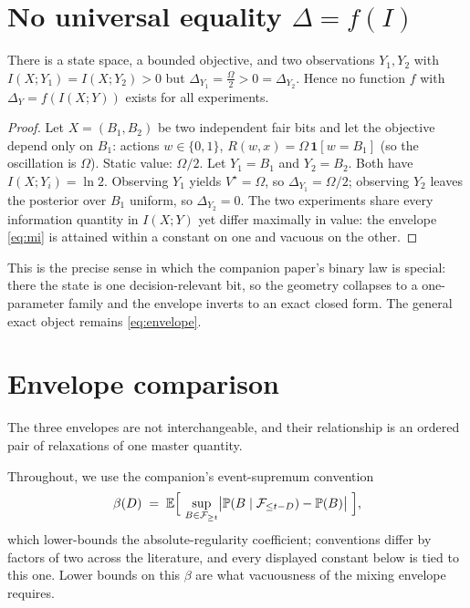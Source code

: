 \documentclass[acmsmall,screen,review,anonymous]{acmart}
\newcommand{\E}{\mathbb{E}}
\begin{document}
\section{No universal equality \texorpdfstring{$\Delta=f(I)$}{Delta=f(I)}}
\label{sec:noequality}

\begin{proposition}
\label{prop:noneq}
There is a state space, a bounded objective, and two observations
$Y_1, Y_2$ with $I(X;Y_1)=I(X;Y_2)>0$ but
$\Delta_{Y_1}=\tfrac{\Omega}{2}>0=\Delta_{Y_2}$. Hence no
function $f$ with $\Delta_Y=f(I(X;Y))$ exists for all experiments.
\end{proposition}

\begin{proof}
Let $X=(B_1,B_2)$ be two independent fair bits and let the objective depend
only on $B_1$: actions $w\in\{0,1\}$, $R(w,x)=\Omega\,\mathbf 1[w=B_1]$
(so the oscillation is $\Omega$). Static value: $\Omega/2$. Let $Y_1=B_1$
and $Y_2=B_2$. Both have $I(X;Y_i)=\ln 2$. Observing $Y_1$ yields
$V^\star=\Omega$, so $\Delta_{Y_1}=\Omega/2$; observing $Y_2$ leaves the
posterior over $B_1$ uniform, so $\Delta_{Y_2}=0$. The two experiments share
every information quantity in $I(X;Y)$ yet differ maximally in value: the
envelope \eqref{eq:mi} is attained within a constant on one and vacuous on
the other.
\end{proof}

\begin{remark}
This is the precise sense in which the companion paper's binary law is
special: there the state is one decision-relevant bit, so the geometry
collapses to a one-parameter family and the envelope inverts to an exact
closed form. The general exact object remains \eqref{eq:envelope}.
\end{remark}

\section{Envelope comparison}\label{sec:comparison}

The three envelopes are not interchangeable, and their relationship is an
ordered pair of relaxations of one master quantity.

Throughout, we use the companion's event-supremum convention
\[
\beta(D)\;=\;\E\Bigl[\ \sup_{B\in\mathcal F_{\ge t}}
\bigl|\mathbb P(B\mid\mathcal F_{\le t-D})-\mathbb P(B)\bigr|\ \Bigr],
\]
which lower-bounds the absolute-regularity coefficient; conventions differ
by factors of two across the literature, and every displayed constant below
is tied to this one. Lower bounds on this $\beta$ are what vacuousness of
the mixing envelope requires.
\end{document}

